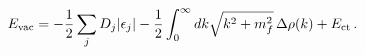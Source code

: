 \begin{equation}
E_{\rm vac} = -\frac{1}{2}\sum_j D_j|\epsilon_j| - 
\frac{1}{2}\int_0^\infty dk \sqrt{k^2+m_f^2}\, \Delta\rho(k) + E_{\rm ct} \, .
\label{Evac2}
\end{equation} 
